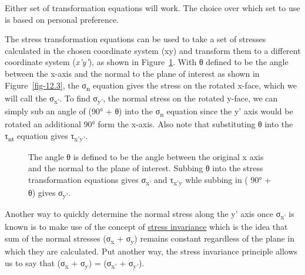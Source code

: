 \documentclass[
  letterpaper,
  DIV=11,
  numbers=noendperiod]{scrreprt}
\theoremstyle{definition}
\theoremstyle{remark}
\begin{document}
Either set of transformation equations will work. The choice over which
set to use is based on personal preference.

The stress transformation equations can be used to take a set of
stresses calculated in the chosen coordinate system (xy) and transform
them to a different coordinate system (\emph{x'y'}), as shown in
Figure~\ref{fig-12.4}. With θ defined to be the angle between the x-axis
and the normal to the plane of interest as shown in
Figure~\ref{fig-12.3}, the σ\textsubscript{n} equation gives the stress
on the rotated x-face, which we will call the σ\textsubscript{x'}. To
find σ\textsubscript{y'}, the normal stress on the rotated y-face, we
can simply sub an angle of (90° + θ) into the σ\textsubscript{n}
equation since the y' axis would be rotated an additional 90° form the
x-axis. Also note that substituting θ into the τ\textsubscript{nt}
equation gives τ\textsubscript{x'y'}.

\begin{figure}


\caption{\label{fig-12.4}The angle θ is defined to be the angle between
the original x axis and the normal to the plane of interest. Subbing θ
into the stress transformation equations gives σ\textsubscript{x'} and
τ\textsubscript{x'y} whle subbing in ( 90° + θ) gives
σ\textsubscript{y'}.}

\end{figure}%

Another way to quickly determine the normal stress along the y' axis
once σ\textsubscript{x'} is known is to make use of the concept of
\ul{stress invariance} which is the idea that sum of the normal stresses
(σ\textsubscript{x} + σ\textsubscript{y}) remains constant regardless of
the plane in which they are calculated. Put another way, the stress
invariance principle allows us to say that (σ\textsubscript{x} +
σ\textsubscript{y}) = (σ\textsubscript{x'} + σ\textsubscript{y'}).
\end{document}
